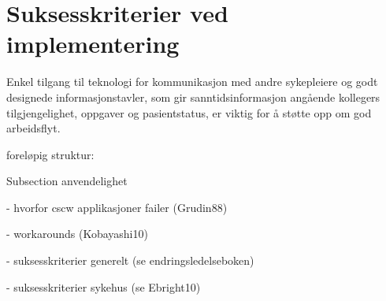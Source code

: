 \section{Suksesskriterier ved implementering}
\label{chp: suksesskriterier}


\noindent
Enkel tilgang til teknologi for kommunikasjon med andre sykepleiere og godt designede informasjonstavler, som gir sanntidsinformasjon angående kollegers tilgjengelighet, oppgaver og pasientstatus, er viktig for å støtte opp om god arbeidsflyt\cite{Ebright10}. 


foreløpig struktur:

Subsection anvendelighet


- hvorfor cscw applikasjoner failer (Grudin88)

- workarounds (Kobayashi10)

- suksesskriterier generelt (se endringsledelseboken)

- suksesskriterier sykehus (se Ebright10)

\noindent




